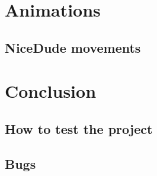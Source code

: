 \documentclass[a4paper,11pt, titlepage]{report}
\begin{document}
\chapter{Animations}

	\section{NiceDude movements}

\chapter{Conclusion}
	
	\section{How to test the project}

	\section{Bugs}


\begin{thebibliography}{999}
\end{thebibliography}
\end{document}
